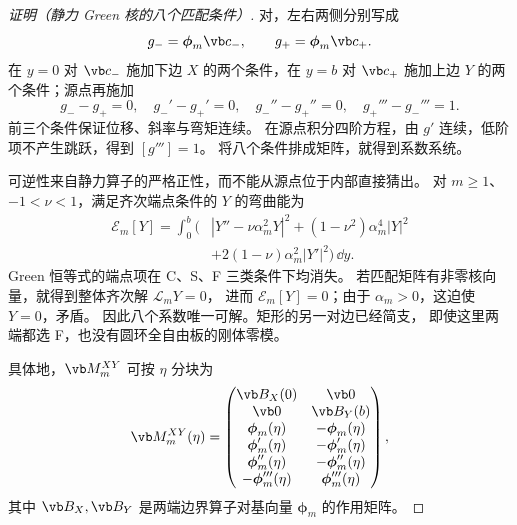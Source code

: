 \begin{proof}[证明（静力 Green 核的八个匹配条件）]
对，左右两侧分别写成
\[
 g_- =\boldsymbol\phi_m\vb c_-,
 \qquad
 g_+ =\boldsymbol\phi_m\vb c_+.
\]
在 \(y=0\) 对 \(\vb c_-\) 施加下边 \(X\) 的两个条件，在 \(y=b\) 对 \(\vb c_+\) 施加上边 \(Y\) 的两个条件；源点再施加
\[
 g_--g_+=0,\quad
 g_-' -g_+'=0,\quad
 g_-''-g_+''=0,\quad
 g_+'''-g_-'''=1.
\]
前三个条件保证位移、斜率与弯矩连续。
在源点积分四阶方程，由 $g'$ 连续，低阶项不产生跳跃，得到 $[g''']=1$。
将八个条件排成矩阵，就得到系数系统。

可逆性来自静力算子的严格正性，而不能从源点位于内部直接猜出。
对 $m\ge1$、$-1<\nu<1$，满足齐次端点条件的 $Y$ 的弯曲能为
\[
\begin{aligned}
\mathcal E_m[Y]
=\int_0^b\bigl(&|Y''-\nu\alpha_m^2Y|^2
+(1-\nu^2)\alpha_m^4|Y|^2\\
&+2(1-\nu)\alpha_m^2|Y'|^2\bigr)\,\dd y.
\end{aligned}
\]
Green 恒等式的端点项在 C、S、F 三类条件下均消失。
若匹配矩阵有非零核向量，就得到整体齐次解 $\mathscr L_mY=0$，
进而 $\mathcal E_m[Y]=0$；由于 $\alpha_m>0$，这迫使 $Y=0$，矛盾。
因此八个系数唯一可解。矩形的另一对边已经简支，
即使这里两端都选 F，也没有圆环全自由板的刚体零模。

具体地，\(\vb M_m^{XY}\) 可按 \(\eta\) 分块为
\[
 \vb M_m^{XY}(\eta)=
 \begin{pmatrix}
  \vb B_X(0) & \vb 0\\
  \vb 0 & \vb B_Y(b)\\
  \boldsymbol\phi_m(\eta) & -\boldsymbol\phi_m(\eta)\\
  \boldsymbol\phi_m'(\eta) & -\boldsymbol\phi_m'(\eta)\\
  \boldsymbol\phi_m''(\eta) & -\boldsymbol\phi_m''(\eta)\\
  -\boldsymbol\phi_m'''(\eta) & \boldsymbol\phi_m'''(\eta)
 \end{pmatrix},
\]
其中 \(\vb B_X,\vb B_Y\) 是两端边界算子对基向量 \(\boldsymbol\phi_m\) 的作用矩阵。
\end{proof}

